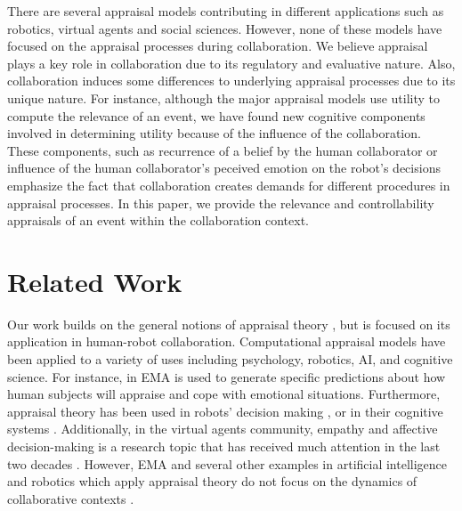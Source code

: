 \documentclass{article}
\begin{document}
There are several appraisal models contributing in different applications such
as robotics, virtual agents and social sciences. However, none of these models
have focused on the appraisal processes during collaboration. We believe
appraisal plays a key role in collaboration due to its regulatory and evaluative
nature. Also, collaboration induces some differences to underlying appraisal
processes due to its unique nature. For instance, although the major appraisal
models use utility to compute the relevance of an event, we have found new
cognitive components involved in determining utility because of the influence of
the collaboration. These components, such as recurrence of a belief by the human
collaborator or influence of the human collaborator's peceived emotion on the 
robot's decisions emphasize the fact that collaboration creates demands for
different procedures in appraisal processes. In this paper, we provide the
relevance and controllability appraisals of an event within the collaboration
context.


\vspace*{-2mm}
\section{Related Work}
\vspace*{-1mm}
Our work builds on the general notions of appraisal theory
\cite{gratch:domain-independent,marsella:computational,scherer:sequential-appraisal-process,scherer:appraisal-processes},
but is focused on its application in human-robot collaboration. Computational
appraisal models have been applied to a variety of uses including psychology,
robotics, AI, and cognitive science. For instance, in
\cite{marsella:ema-process-model} EMA is used to generate specific predictions
about how human subjects will appraise and cope with emotional situations.
Furthermore, appraisal theory has been used in robots' decision making
\cite{castro:autonomous-robot-fear}, or in their cognitive systems
\cite{hudlicka:emotinos-reasons,marinier:emotion-reinforcement}. Additionally,
in the virtual agents community, empathy and affective decision-making is a
research topic that has received much attention in the last two decades
\cite{scott:modeling-empathy-agent,paiva:agent-care,pontier:women-robot-men,velasquez:emotions-motivations-agents}.
However, EMA and several other examples in artificial intelligence and robotics
which apply appraisal theory do not focus on the dynamics of collaborative
contexts
\cite{adam:bdi-emotional-companion,kim:model-hri-appraisal,marsella:ema-process-model,rosenbloom:sigma-appraisal}.
\end{document}
